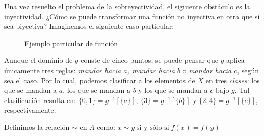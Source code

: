 \documentclass[letterpaper,DIV=14,headsepline,12pt]{scrartcl}
\begin{document}
    Una vez resuelto el problema de la sobreyectividad, el siguiente obstáculo
    es la inyectividad. ¿Cómo se puede transformar una función no inyectiva en
    otra que sí sea biyectiva? Imaginemos el siguiente caso particular:
    \begin{figure}[H]\label{fig:ejemplo}
        \begin{center}
        \end{center}
        \caption{Ejemplo particular de función}
    \end{figure}

    Aunque el dominio de $g$ conste de cinco puntos, se puede pensar que $g$
    aplica únicamente tres reglas: \textit{mandar hacia $a$, mandar hacia $b$} o
    \textit{mandar hacia $c$}, según sea el caso. Por lo cual, podemos
    clasificar a los elementos de $X$ en tres \textit{clases}: los que se mandan
    a $a$, los que se mandan a $b$ y los que se mandan a $c$ bajo $g$. Tal
    clasificación resulta en: $\{0,1\}=g^{-1}[\{a\}]$, $\{3\}=g^{-1}[\{b\}]$ y
    $\{2,4\}=g^{-1}[\{c\}]$, respectivamente.

    \begin{definicion}
        Definimos la relación $\sim$ en $A$ como: $ x \sim y \; \text{si y sólo
        si} \; f(x)=f(y)$
    \end{definicion}
\end{document}
